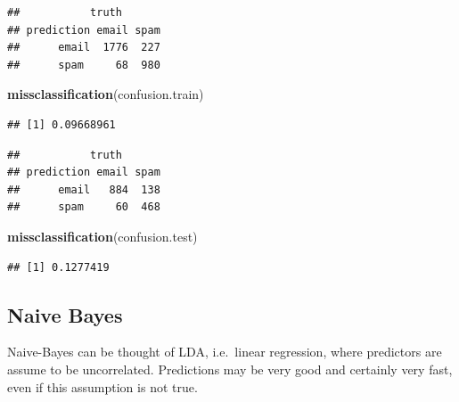 \documentclass[]{book}
\newenvironment{Shaded}{\begin{snugshade}}{\end{snugshade}}
\newcommand{\KeywordTok}[1]{\textcolor[rgb]{0.13,0.29,0.53}{\textbf{#1}}}
\newcommand{\DataTypeTok}[1]{\textcolor[rgb]{0.13,0.29,0.53}{#1}}
\newcommand{\DecValTok}[1]{\textcolor[rgb]{0.00,0.00,0.81}{#1}}
\newcommand{\StringTok}[1]{\textcolor[rgb]{0.31,0.60,0.02}{#1}}
\newcommand{\CommentTok}[1]{\textcolor[rgb]{0.56,0.35,0.01}{\textit{#1}}}
\newcommand{\OperatorTok}[1]{\textcolor[rgb]{0.81,0.36,0.00}{\textbf{#1}}}
\newcommand{\NormalTok}[1]{#1}
\theoremstyle{definition}
\theoremstyle{definition}
\theoremstyle{definition}
\theoremstyle{remark}
\begin{document}
\begin{verbatim}
##           truth
## prediction email spam
##      email  1776  227
##      spam     68  980
\end{verbatim}

\begin{Shaded}
\begin{Highlighting}[]
\KeywordTok{missclassification}\NormalTok{(confusion.train)}
\end{Highlighting}
\end{Shaded}

\begin{verbatim}
## [1] 0.09668961
\end{verbatim}

\begin{Shaded}
\end{Shaded}

\begin{verbatim}
##           truth
## prediction email spam
##      email   884  138
##      spam     60  468
\end{verbatim}

\begin{Shaded}
\begin{Highlighting}[]
\KeywordTok{missclassification}\NormalTok{(confusion.test)}
\end{Highlighting}
\end{Shaded}

\begin{verbatim}
## [1] 0.1277419
\end{verbatim}

\subsection{Naive Bayes}\label{naive-bayes}

Naive-Bayes can be thought of LDA, i.e.~linear regression, where
predictors are assume to be uncorrelated. Predictions may be very good
and certainly very fast, even if this assumption is not true.
\end{document}
